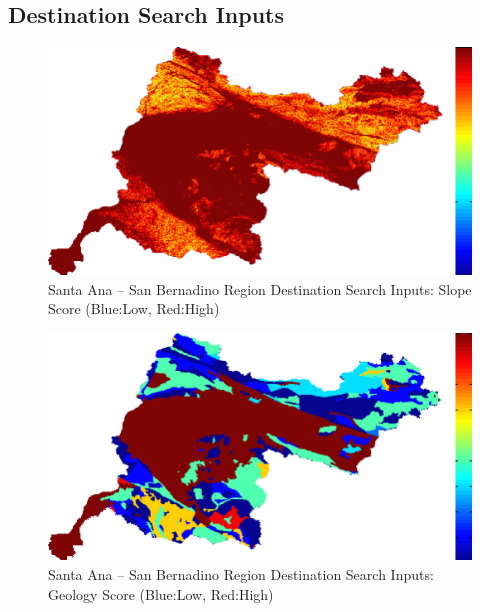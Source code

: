 \subsection{Destination Search Inputs}
    
        \begin{figure}[!h]
            \begin{center}
            \includegraphics[width=5.5in]{figures/SanBernadino_Search_Slope.png}   
            \caption{Santa Ana -- San Bernadino Region Destination Search Inputs: Slope Score (Blue:Low, Red:High)}
            \label{fig:SASBdsinputs_slope}
            \end{center}
        \end{figure}
        
        \begin{figure}[!h]
            \begin{center}
            \includegraphics[width=5.5in]{figures/SanBernadino_Search_Geology.png}   
            \caption{Santa Ana -- San Bernadino Region Destination Search Inputs: Geology Score (Blue:Low, Red:High)}
            \label{fig:SASBdsinputs_geology}
            \end{center}
        \end{figure}
    

